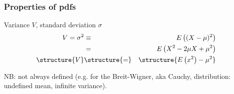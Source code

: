 \documentclass[9pt]{beamer}
\newif\ifmynote
\newcommand\mynote[1]{%
\ifmynote \textbf{#1} \else \fi
}
\begin{document}
\begin{frame}
 \frametitle{Properties of pdfs}
 
 \mynote{Écrire au tableau}

 \begin{block}{Variance $V$, standard deviation $\sigma$}
  \begin{eqnarray}
   V = \sigma^2 & \equiv & E \left( (X-\mu)^2 \right) \nonumber\\
   & = & E \left( X^2 - 2 \mu X + \mu^2\right) \nonumber\\
   \structure{V} & \structure{=} & \structure{E\left( x^2 \right) - \mu^2} \nonumber
  \end{eqnarray}

 \end{block}

 NB: not always defined (e.g. for the Breit-Wigner, aka Cauchy, distribution: undefined mean, infinite variance).

\end{frame}
\end{document}
